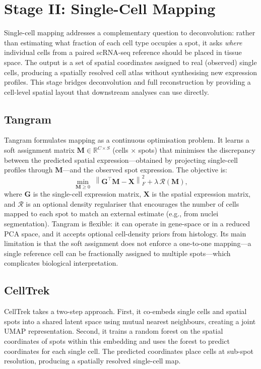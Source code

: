 \section{Stage II: Single-Cell Mapping}
\label{sec:stage2}

Single-cell mapping addresses a complementary question to deconvolution: rather than estimating what fraction of each cell type occupies a spot, it asks \emph{where} individual cells from a paired scRNA-seq reference should be placed in tissue space. The output is a set of spatial coordinates assigned to real (observed) single cells, producing a spatially resolved cell atlas without synthesising new expression profiles. This stage bridges deconvolution and full reconstruction by providing a cell-level spatial layout that downstream analyses can use directly.

\subsection{Tangram}

Tangram \citep{biancalani2021deep} formulates mapping as a continuous optimisation problem. It learns a soft assignment matrix $\mathbf{M} \in \mathbb{R}^{C \times S}$ (cells $\times$ spots) that minimises the discrepancy between the predicted spatial expression---obtained by projecting single-cell profiles through $\mathbf{M}$---and the observed spot expression. The objective is:
\begin{equation}
  \min_{\mathbf{M} \geq 0} \; \left\| \mathbf{G}^\top \mathbf{M} - \mathbf{X} \right\|_F^2 + \lambda\,\mathcal{R}(\mathbf{M}),
\end{equation}
where $\mathbf{G}$ is the single-cell expression matrix, $\mathbf{X}$ is the spatial expression matrix, and $\mathcal{R}$ is an optional density regulariser that encourages the number of cells mapped to each spot to match an external estimate (e.g., from nuclei segmentation). Tangram is flexible: it can operate in gene-space or in a reduced PCA space, and it accepts optional cell-density priors from histology. Its main limitation is that the soft assignment does not enforce a one-to-one mapping---a single reference cell can be fractionally assigned to multiple spots---which complicates biological interpretation.

\subsection{CellTrek}

CellTrek \citep{wei2022celltrek} takes a two-step approach. First, it co-embeds single cells and spatial spots into a shared latent space using mutual nearest neighbours, creating a joint UMAP representation. Second, it trains a random forest on the spatial coordinates of spots within this embedding and uses the forest to predict coordinates for each single cell. The predicted coordinates place cells at sub-spot resolution, producing a spatially resolved single-cell map.

